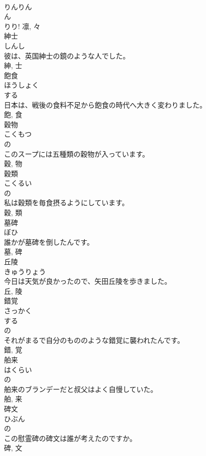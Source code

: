 \documentclass[8pt]{extreport}
\begin{document}
\begin{CJK}{UTF8}{min}
\\	りんりん 
\\	ん
\\	りり!	凛, 々	
\\	紳士	
\\	しんし	
\\	彼は、英国紳士の鏡のような人でした。	
\\	紳, 士	
\\	飽食	
\\	ほうしょく	
\\	する 
\\	日本は、戦後の食料不足から飽食の時代へ大きく変わりました。	
\\	飽, 食	
\\	穀物	
\\	こくもつ	
\\	の 
\\	このスープには五種類の穀物が入っています。	
\\	穀, 物	
\\	穀類	
\\	こくるい	
\\	の 
\\	私は穀類を毎食摂るようにしています。	
\\	穀, 類	
\\	墓碑	
\\	ぼひ	
\\	誰かが墓碑を倒したんです。	
\\	墓, 碑	
\\	丘陵	
\\	きゅうりょう	
\\	今日は天気が良かったので、矢田丘陵を歩きました。	
\\	丘, 陵	
\\	錯覚	
\\	さっかく	
\\	する 
\\	の 
\\	それがまるで自分のもののような錯覚に襲われたんです。	
\\	錯, 覚	
\\	舶来	
\\	はくらい	
\\	の 
\\	舶来のブランデーだと叔父はよく自慢していた。	
\\	舶, 来	
\\	碑文	
\\	ひぶん	
\\	の 
\\	この慰霊碑の碑文は誰が考えたのですか。	
\\	碑, 文	

\end{CJK}
\end{document}
